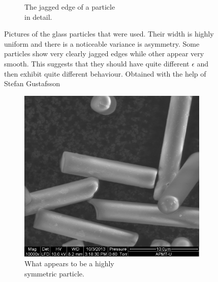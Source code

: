 \begin{figure}[H]
\begin{subfigure}[3b]{0.40\textwidth}
\caption{The jagged edge of a particle \\ in detail.}
\end{subfigure}
\caption{Pictures of the glass particles that were used. Their width is highly uniform and there is a noticeable variance is asymmetry. Some particles show very clearly jagged edges while other appear very smooth. This suggests that they should have quite different $\epsilon$ and then exhibit quite different behaviour. Obtained with the help of Stefan Gustafsson}
\label{fig:particlepictures}
\end{figure}
 
\begin{figure}[H]
\centering
\begin{subfigure}[3a]{0.40\textwidth}
\includegraphics[width=\textwidth]{figures/method/symmetric.png}
\caption{What appears to be a highly \\ symmetric particle.}\label{fig:symmetricparticle}
\end{subfigure}\hspace{1em}%
\begin{subfigure}[3b]{0.40\textwidth}

\end{subfigure}
\end{figure}
